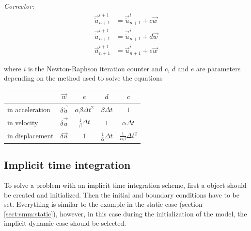 \noindent\textit{Corrector:}
\begin{align} 
  \vec{\ddot{u}}_{n+1}^{i+1} &= \vec{\ddot{u}}_{n+1}^{i} +c \vec{w} \\ 
  \vec{\dot{u}}_{n+1}^{i+1} &= \vec{\dot{u}}_{n+1}^{i} + d\vec{w} \\ 
  \vec{u}_{n+1}^{i+1} &= \vec{u}_{n+1}^{i} + e \vec{w}
\end{align}

where $i$ is the Newton-Raphson iteration counter and $c$, $d$ and $e$
are parameters depending on the method used to solve the equations

\begin{center}
  \begin{tabular}{lcccc} 
    \toprule 
    & $\vec{w}$ & $e$ & $d$ & $c$\\
    \midrule 
    in acceleration &$ \delta\vec{\ddot{u}}$ & $\alpha \beta\Delta t^2$ &$\beta \Delta t$ &$1$\\ 
    in velocity & $ \delta\vec{\dot{u}}$& $\frac{1}{\beta} \Delta t$ & $1$ & $\alpha\Delta t$\\ 
    in displacement &$\delta\vec{u}$ & $ 1$ & $\frac{1}{\alpha} \Delta t$ & $\frac{1}{\alpha \beta} \Delta t^2$\\
    \bottomrule
  \end{tabular}
\end{center}



\subsection{Implicit time integration} 
To solve a problem with an
implicit time integration scheme, first a 
object should be created and initialized.  Then the initial and
boundary conditions have to be set.  Everything is similar to the
example in the static case (section \ref{sect:smm:static}), however,
in this case during the initialization of the model, the implicit
dynamic case should be selected.

